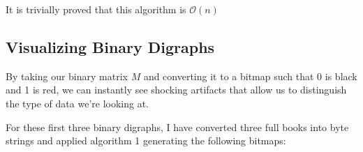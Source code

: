 \documentclass[12pt,a4paper]{article}
\begin{document}
It is trivially proved that this algorithm is $\mathcal{O}(n)$ 

\subsection{Visualizing Binary Digraphs}
By taking our binary matrix $M$ and converting it to a bitmap such that 0 is black and 1 is red, we can instantly see shocking artifacts that allow us to distinguish the type of data we're looking at.

For these first three binary digraphs, I have converted three full books into byte strings and applied algorithm 1 generating the following bitmaps:

\begin{figure}[!h]
    \centering
\end{figure}
\end{document}
